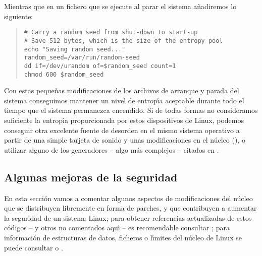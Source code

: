 \rm
Mientras que en un fichero que se ejecute al parar el sistema a\~nadiremos lo
siguiente:
\tt
\begin{quote}
\begin{verbatim}
# Carry a random seed from shut-down to start-up
# Save 512 bytes, which is the size of the entropy pool
echo "Saving random seed..."
random_seed=/var/run/random-seed
dd if=/dev/urandom of=$random_seed count=1
chmod 600 $random_seed
\end{verbatim}
\end{quote}
\rm
Con estas peque\~nas modificaciones de los archivos de arranque y parada del
sistema conseguimos mantener un nivel de entrop\'{\i}a aceptable durante todo
el tiempo que el sistema permanezca encendido.
Si de todas formas no consideramos suficiente la entrop\'{\i}a proporcionada 
por estos dispositivos de Linux, podemos conseguir otra excelente fuente de
desorden en el mismo sistema operativo a partir de una simple tarjeta de sonido y unas modificaciones en el n\'ucleo (\cite{kn:phrack54}), o utilizar alguno de
los generadores -- algo m\'as complejos -- citados en \cite{kn:sch94}.
\subsection{Algunas mejoras de la seguridad}
En esta secci\'on vamos a comentar algunos aspectos de modificaciones del 
n\'ucleo que se distribuyen libremente en forma de parches, y que contribuyen
a aumentar la seguridad de un sistema Linux; para obtener referencias 
actualizadas de estos c\'odigos -- y otros no comentados aqu\'{\i} -- es 
re\-co\-men\-da\-ble consultar \cite{kn:sei99}; para informaci\'on de 
estructuras de datos, ficheros o l\'{\i}mites del n\'ucleo de Linux se puede
consultar \cite{kn:bec96} o \cite{kn:car97}.
